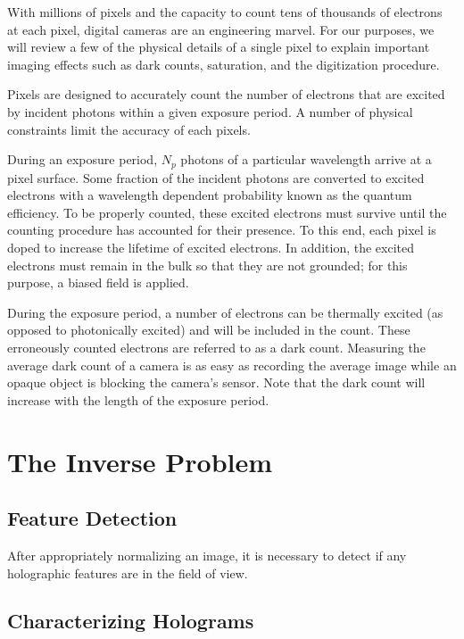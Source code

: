 With millions of pixels and the capacity to count tens of thousands of electrons at each pixel,
digital cameras are an engineering marvel. For our purposes, we will review a few of the physical
details of a single pixel to explain important imaging effects such as dark counts, saturation,
and the digitization procedure.

Pixels are designed to accurately count the number of electrons that are
excited by incident photons within a given exposure period. A number of physical constraints
limit the accuracy of each pixels.

During an exposure period, $N_p$ photons of a particular wavelength arrive at a pixel
surface. Some fraction of the incident photons are converted to excited electrons
with a wavelength dependent probability known as the quantum efficiency. To be properly
counted, these excited electrons must survive until the counting procedure has
accounted for their presence. To this end, each pixel is doped to increase the lifetime
of excited electrons. In addition, the excited electrons must remain in the bulk so that
they are not grounded; for this purpose, a biased field is applied. %

During the exposure period, a number of electrons can be thermally excited (as opposed to
photonically excited) and will be included in the count. These erroneously
counted electrons are referred to as a dark count. Measuring the average dark count of a
camera is as easy as recording the average image while an opaque object is blocking the
camera's sensor. Note that the dark count will increase with the length of the exposure
period.



\section{The Inverse Problem}

\subsection{Feature Detection}

After appropriately normalizing an image, it is necessary to detect if any holographic
features are in the field of view. 

\subsection{Characterizing Holograms}
